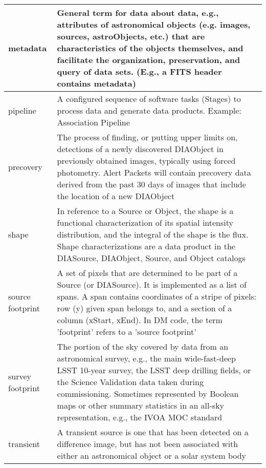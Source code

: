 \begin{longtable}{|p{}|p{}|}
metadata & General term for data about data, e.g., attributes of astronomical objects (e.g. images, sources, astroObjects, etc.) that are characteristics of the objects themselves, and facilitate the organization, preservation, and query of data sets. (E.g., a \gls{FITS} header contains \gls{metadata}) \\\hline
pipeline & A configured sequence of software tasks (Stages) to process data and generate data products. Example: \gls{Association Pipeline} \\\hline
precovery & The process of finding, or putting upper limits on, detections of a newly discovered \gls{DIAObject} in previously obtained images, typically using \gls{forced photometry}. \gls{Alert} Packets will contain \gls{precovery} data derived from the past 30 days of images that include the location of a new \gls{DIAObject} \\\hline
shape & In reference to a Source or \gls{Object}, the \gls{shape} is a functional characterization of its spatial intensity distribution, and the integral of the \gls{shape} is the \gls{flux}. Shape characterizations are a data product in the \gls{DIASource}, \gls{DIAObject}, Source, and \gls{Object} catalogs \\\hline
source \gls{footprint} & A set of pixels that are determined to be part of a Source (or \gls{DIASource}). It is implemented as a list of spans. A span contains coordinates of a stripe of pixels: row (y) given span belongs to, and a section of a column (xStart, xEnd). In \gls{DM} code, the term 'footprint' refers to a 'source \gls{footprint}' \\\hline
survey \gls{footprint} & The portion of the sky covered by data from an astronomical survey, e.g., the main wide-fast-deep \gls{LSST} 10-year survey, the \gls{LSST} deep drilling fields, or the Science \gls{Validation} data taken during commissioning.  Sometimes represented by Boolean maps or other summary statistics in an all-sky representation, e.g., the \gls{IVOA} \gls{MOC} standard \\\hline
transient & A \gls{transient} source is one that has been detected on a difference image, but has not been associated with either an \gls{astronomical object} or a solar system body \\\hline
\end{longtable}
